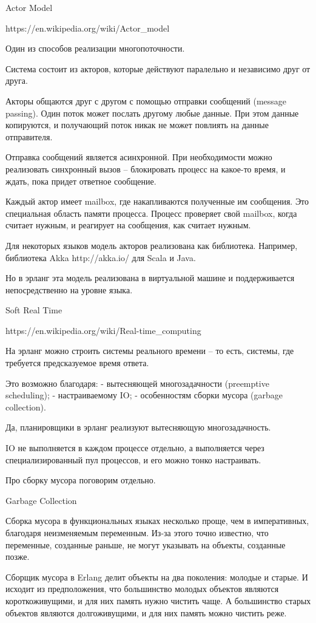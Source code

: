 \documentclass[10pt]{beamer}
\begin{document}
Actor Model

https://en.wikipedia.org/wiki/Actor_model

Один из способов реализации многопоточности.

Система состоит из акторов, которые действуют паралельно и независимо друг от друга.

Акторы общаются друг с другом с помощью отправки сообщений (message passing).
Один поток может послать другому любые данные.
При этом данные копируются, и получающий поток никак не может повлиять на данные отправителя.

Отправка сообщений является асинхронной.
При необходимости можно реализовать синхронный вызов -- блокировать процесс на какое-то время, и ждать, пока придет ответное сообщение.

Каждый актор имеет mailbox, где накапливаются полученные им сообщения.
Это специальная область памяти процесса.
Процесс проверяет свой mailbox, когда считает нужным, и реагирует на сообщения, как считает нужным.

Для некоторых языков модель акторов реализована как библиотека.
Например, библиотека Akka http://akka.io/ для Scala и Java.

Но в эрланг эта модель реализована в виртуальной машине и поддерживается непосредственно на уровне языка.


Soft Real Time

https://en.wikipedia.org/wiki/Real-time_computing

На эрланг можно строить системы реального времени -- то есть, системы, где требуется предсказуемое время ответа.

Это возможно благодаря:
- вытесняющей многозадачности (preemptive scheduling);
- настраиваемому IO;
- особенностям сборки мусора (garbage collection).

Да, планировщики в эрланг реализуют вытесняющую многозадачность.

IO не выполняется в каждом процессе отдельно, а выполняется через специализированный пул процессов,
и его можно тонко настраивать.

Про сборку мусора поговорим отдельно.


Garbage Collection

Сборка мусора в функциональных языках несколько проще, чем в
императивных, благодаря неизменяемым переменным.  Из-за этого точно
известно, что переменные, созданные раньше, не могут указывать на
объекты, созданные позже.

Сборщик мусора в Erlang делит объекты на два поколения: молодые и
старые. И исходит из предположения, что большинство молодых объектов
являются короткоживущими, и для них память нужно чистить чаще. А
большинство старых объектов являются долгоживущими, и для них память
можно чистить реже.
\end{document}
